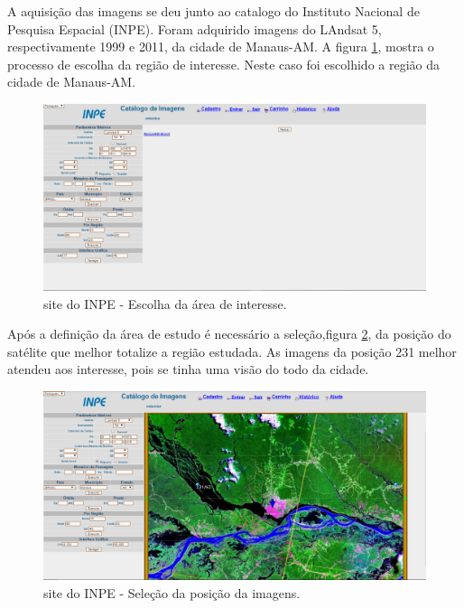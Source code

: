 \hspace{1.5cm}
A aquisição das imagens se deu junto ao catalogo do Instituto Nacional de Pesquisa Espacial (INPE). Foram adquirido imagens do LAndsat 5, respectivamente 1999 e 2011, da cidade de Manaus-AM. A figura \ref{Aquisição1}, mostra o processo de escolha da região de interesse. Neste caso foi escolhido a região da cidade de Manaus-AM.\\
\begin{figure}[!htpb]
        \centering
        \includegraphics[scale=0.3]{imagens/aquisicao.png}
        \caption{site do INPE - Escolha da área de interesse.}
        \label{Aquisição1}
\end{figure}

\hspace{1.5cm}
Após a definição da área de estudo é necessário a seleção,figura \ref{Aquisição2}, da posição do satélite que melhor totalize a região estudada. As imagens da posição 231 melhor atendeu aos interesse, pois se tinha uma visão do todo da cidade.\\
\begin{figure}[!htp]
        \centering
        \includegraphics[scale=0.3]{imagens/aquisicao_02.png}
        \caption{site do INPE - Seleção da posição da imagens.}
        \label{Aquisição2}
\end{figure}

